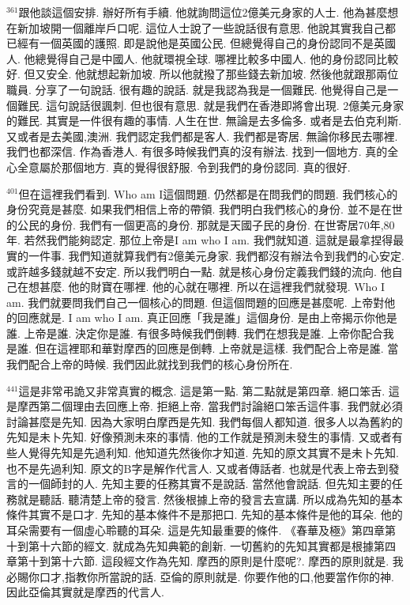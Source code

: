 \documentclass{book}
\begin{document}
$^{361}$跟他談這個安排.
辦好所有手續.
他就詢問這位2億美元身家的人士.
他為甚麼想在新加坡開一個離岸戶口呢.
這位人士說了一些說話很有意思.
他說其實我自己都已經有一個英國的護照.
即是說他是英國公民.
但總覺得自己的身份認同不是英國人.
他總覺得自己是中國人.
他就環視全球.
哪裡比較多中國人.
他的身份認同比較好.
但又安全.
他就想起新加坡.
所以他就撥了那些錢去新加坡.
然後他就跟那兩位職員.
分享了一句說話.
很有趣的說話.
就是我認為我是一個難民.
他覺得自己是一個難民.
這句說話很諷刺.
但也很有意思.
就是我們在香港即將會出現.
2億美元身家的難民.
其實是一件很有趣的事情.
人生在世.
無論是去多倫多.
或者是去伯克利斯.
又或者是去美國,澳洲.
我們認定我們都是客人.
我們都是寄居.
無論你移民去哪裡.
我們也都深信.
作為香港人.
有很多時候我們真的沒有辦法.
找到一個地方.
真的全心全意屬於那個地方.
真的覺得很舒服.
令到我們的身份認同.
真的很好.

$^{401}$但在這裡我們看到.
Who am I這個問題.
仍然都是在問我們的問題.
我們核心的身份究竟是甚麼.
如果我們相信上帝的帶領.
我們明白我們核心的身份.
並不是在世的公民的身份.
我們有一個更高的身份.
那就是天國子民的身份.
在世寄居70年,80年.
若然我們能夠認定.
那位上帝是I am who I am.
我們就知道.
這就是最拿捏得最實的一件事.
我們知道就算我們有2億美元身家.
我們都沒有辦法令到我們的心安定.
或許越多錢就越不安定.
所以我們明白一點.
就是核心身份定義我們錢的流向.
他自己在想甚麼.
他的財寶在哪裡.
他的心就在哪裡.
所以在這裡我們就發現.
Who I am.
我們就要問我們自己一個核心的問題.
但這個問題的回應是甚麼呢.
上帝對他的回應就是.
I am who I am.
真正回應「我是誰」這個身份.
是由上帝揭示你他是誰.
上帝是誰.
決定你是誰.
有很多時候我們倒轉.
我們在想我是誰.
上帝你配合我是誰.
但在這裡耶和華對摩西的回應是倒轉.
上帝就是這樣.
我們配合上帝是誰.
當我們配合上帝的時候.
我們因此就找到我們的核心身份所在.

$^{441}$這是非常弔詭又非常真實的概念.
這是第一點.
第二點就是第四章.
絕口笨舌.
這是摩西第二個理由去回應上帝.
拒絕上帝.
當我們討論絕口笨舌這件事.
我們就必須討論甚麼是先知.
因為大家明白摩西是先知.
我們每個人都知道.
很多人以為舊約的先知是未卜先知.
好像預測未來的事情.
他的工作就是預測未發生的事情.
又或者有些人覺得先知是先過利知.
他知道先然後你才知道.
先知的原文其實不是未卜先知.
也不是先過利知.
原文的B字是解作代言人.
又或者傳話者.
也就是代表上帝去到發言的一個師封的人.
先知主要的任務其實不是說話.
當然他會說話.
但先知主要的任務就是聽話.
聽清楚上帝的發言.
然後根據上帝的發言去宣講.
所以成為先知的基本條件其實不是口才.
先知的基本條件不是那把口.
先知的基本條件是他的耳朵.
他的耳朵需要有一個虛心聆聽的耳朵.
這是先知最重要的條件.
《春華及極》第四章第十到第十六節的經文.
就成為先知典範的創新.
一切舊約的先知其實都是根據第四章第十到第十六節.
這段經文作為先知.
摩西的原則是什麼呢?.
摩西的原則就是.
我必賜你口才,指教你所當說的話.
亞倫的原則就是.
你要作他的口,他要當作你的神.
因此亞倫其實就是摩西的代言人.
\end{document}

